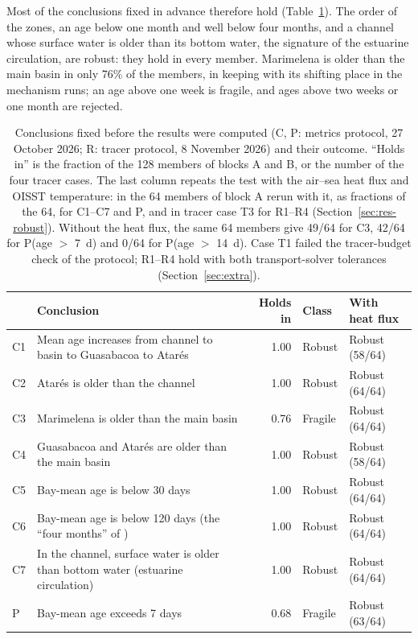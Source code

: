 \documentclass[a4paper,fleqn]{ems-dc}
\begin{document}
Most of the conclusions fixed in advance therefore hold (Table~\ref{tab:concl}). The order of
the zones, an age below one month and well below four months, and a channel whose surface
water is older than its bottom water, the signature of the estuarine circulation, are robust:
they hold in every member. Marimelena is older than the main basin in only 76\% of the
members, in keeping with its shifting place in the mechanism runs; an age above one week is
fragile, and ages above two weeks or one month are rejected.

\begin{table}[!t]
\centering\small
\caption{Conclusions fixed before the results were computed (C, P: metrics protocol,
27 October 2026; R: tracer protocol, 8 November 2026) and their outcome. ``Holds in'' is the
fraction of the 128 members of blocks A and B, or the number of the four tracer cases. The
last column repeats the test with the air--sea heat flux and OISST temperature: in the
64 members of block A rerun with it, as fractions of the 64, for C1--C7 and P, and in
tracer case T3 for R1--R4 (Section~\ref{sec:res-robust}). Without the heat flux, the same 64
members give 49/64 for C3, 42/64 for P(age $>$ 7~d) and 0/64 for P(age $>$ 14~d). Case T1 failed the tracer-budget check of the protocol;
R1--R4 hold with both transport-solver tolerances (Section~\ref{sec:extra}).}\label{tab:concl}
\begin{tabular}{lp{9.6cm}rll}
\toprule
& Conclusion & Holds in & Class & With heat flux\\
\midrule
C1 & Mean age increases from channel to basin to Guasabacoa to Atar\'es & 1.00 & Robust & Robust (58/64)\\
C2 & Atar\'es is older than the channel & 1.00 & Robust & Robust (64/64)\\
C3 & Marimelena is older than the main basin & 0.76 & Fragile & Robust (64/64)\\
C4 & Guasabacoa and Atar\'es are older than the main basin & 1.00 & Robust & Robust (58/64)\\
C5 & Bay-mean age is below 30 days & 1.00 & Robust & Robust (64/64)\\
C6 & Bay-mean age is below 120 days (the ``four months'' of \citealt{JICA2004}) & 1.00 & Robust & Robust (64/64)\\
C7 & In the channel, surface water is older than bottom water (estuarine circulation) & 1.00 & Robust & Robust (64/64)\\
P & Bay-mean age exceeds 7 days & 0.68 & Fragile & Robust (63/64)\\

\end{tabular}
\end{table}
\end{document}
